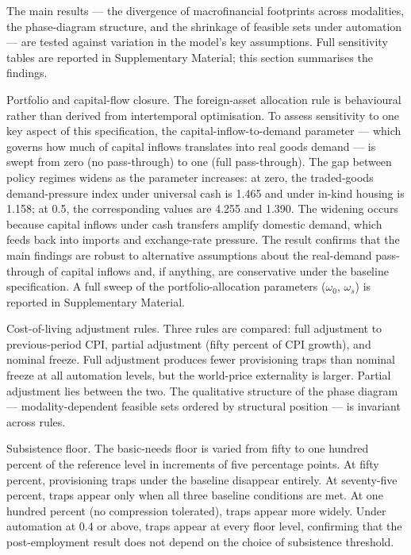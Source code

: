 \documentclass[preprint,review,12pt]{elsarticle}
\begin{document}
The main results --- the divergence of macrofinancial footprints across
modalities, the phase-diagram structure, and the shrinkage of feasible
sets under automation --- are tested against variation in the model's
key assumptions. Full sensitivity tables are reported in Supplementary
Material; this section summarises the findings.

Portfolio and capital-flow closure. The foreign-asset allocation rule is
behavioural rather than derived from intertemporal optimisation. To
assess sensitivity to one key aspect of this specification, the
capital-inflow-to-demand parameter --- which governs how much of capital
inflows translates into real goods demand --- is swept from zero (no
pass-through) to one (full pass-through). The gap between policy regimes
widens as the parameter increases: at zero, the traded-goods
demand-pressure index under universal cash is 1.465 and under in-kind
housing is 1.158; at 0.5, the corresponding values are 4.255 and 1.390.
The widening occurs because capital inflows under cash transfers amplify
domestic demand, which feeds back into imports and exchange-rate
pressure. The result confirms that the main findings are robust to
alternative assumptions about the real-demand pass-through of capital
inflows and, if anything, are conservative under the baseline
specification. A full sweep of the portfolio-allocation parameters ($\omega_0$,
$\omega_s$) is reported in Supplementary Material.

Cost-of-living adjustment rules. Three rules are compared: full
adjustment to previous-period CPI, partial adjustment (fifty percent of
CPI growth), and nominal freeze. Full adjustment produces fewer
provisioning traps than nominal freeze at all automation levels, but the
world-price externality is larger. Partial adjustment lies between the
two. The qualitative structure of the phase diagram ---
modality-dependent feasible sets ordered by structural position --- is
invariant across rules.

Subsistence floor. The basic-needs floor is varied from fifty to one
hundred percent of the reference level in increments of five percentage
points. At fifty percent, provisioning traps under the baseline
disappear entirely. At seventy-five percent, traps appear only when all
three baseline conditions are met. At one hundred percent (no
compression tolerated), traps appear more widely. Under automation at
0.4 or above, traps appear at every floor level, confirming that the
post-employment result does not depend on the choice of subsistence
threshold.
\end{document}
